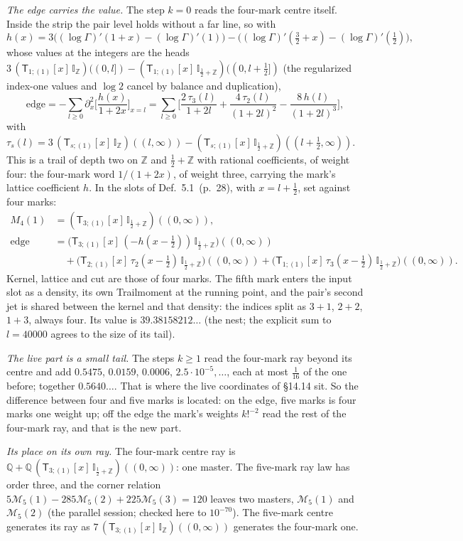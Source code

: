 \documentclass[11pt]{article}
\newcommand{\sT}{\mathsf T}
\newcommand{\IZ}{\mathbb I_{\mathbb Z}}
\newcommand{\Ilat}[1]{\mathbb I_{#1}}
\newcommand{\Tx}[3]{(\sT_{#1;(1)}[x]\,#2)((#3,\infty))}
\newcommand{\Th}[4]{(\sT_{#1;(1)}[x]\,#2)((#3,#4])}
\newcommand{\hb}[2]{#1~(p.~#2)}   %
\theoremstyle{plain}
\theoremstyle{remark}
\begin{document}
\emph{The edge carries the value.} The step $k=0$ reads the four-mark centre itself. Inside the strip the pair level holds without a far line, so with
\[
h(x)=3\big((\log\Gamma)'(1+x)-(\log\Gamma)'(1)\big)-\big((\log\Gamma)'(\tfrac32+x)-(\log\Gamma)'(\tfrac12)\big),
\]
whose values at the integers are the heads $3\,\Th1\IZ0l-\Th1{\Ilat{\frac12+\mathbb Z}}0{l+\frac12}$ (the regularized index-one values and $\log2$ cancel by balance and duplication),
\[
\text{edge}=-\sum_{l\ge0}\partial_x^2\Big[\frac{h(x)}{1+2x}\Big]_{x=l}
=\sum_{l\ge0}\Big[\frac{2\,\tau_3(l)}{1+2l}+\frac{4\,\tau_2(l)}{(1+2l)^2}-\frac{8\,h(l)}{(1+2l)^3}\Big],
\]
with $\tau_s(l)=3\,\Tx{s}{\IZ}{l}-\Tx{s}{\Ilat{\frac12+\mathbb Z}}{l+\frac12}$. This is a trail of depth two on $\mathbb Z$ and $\frac12+\mathbb Z$ with rational coefficients, of weight four: the four-mark word $1/(1+2x)$, of weight three, carrying the mark's lattice coefficient $h$. In the slots of Def.~\hb{5.1}{28}, with $x=l+\frac12$, set against four marks:
\begin{align*}
M_4(1)&=\Tx3{\Ilat{\frac12+\mathbb Z}}0,\\
\text{edge}&=\big(\sT_{3;(1)}[x]\,(-h(x-\tfrac12))\,\Ilat{\frac12+\mathbb Z}\big)((0,\infty))\\
&\quad+\big(\sT_{2;(1)}[x]\,\tau_2(x-\tfrac12)\,\Ilat{\frac12+\mathbb Z}\big)((0,\infty))+\big(\sT_{1;(1)}[x]\,\tau_3(x-\tfrac12)\,\Ilat{\frac12+\mathbb Z}\big)((0,\infty)).
\end{align*}
Kernel, lattice and cut are those of four marks. The fifth mark enters the input slot as a density, its own Trailmoment at the running point, and the pair's second jet is shared between the kernel and that density: the indices split as $3+1$, $2+2$, $1+3$, always four. Its value is $39.38158212\ldots$ (the nest; the explicit sum to $l=40000$ agrees to the size of its tail).

\emph{The live part is a small tail.} The steps $k\ge1$ read the four-mark ray beyond its centre and add $0.5475$, $0.0159$, $0.0006$, $2.5\cdot10^{-5},\dots$, each at most $\frac1{16}$ of the one before; together $0.5640\ldots$. That is where the live coordinates of \S14.14 sit. So the difference between four and five marks is located: on the edge, five marks is four marks one weight up; off the edge the mark's weights $k!^{-2}$ read the rest of the four-mark ray, and that is the new part.

\emph{Its place on its own ray.} The four-mark centre ray is $\mathbb Q+\mathbb Q\,\Tx3{\Ilat{\frac12+\mathbb Z}}0$: one master. The five-mark ray law has order three, and the corner relation $5\mathcal M_5(1)-285\mathcal M_5(2)+225\mathcal M_5(3)=120$ leaves two masters, $\mathcal M_5(1)$ and $\mathcal M_5(2)$ (the parallel session; checked here to $10^{-70}$). The five-mark centre generates its ray as $7\,\Tx3\IZ0$ generates the four-mark one.
\end{document}
